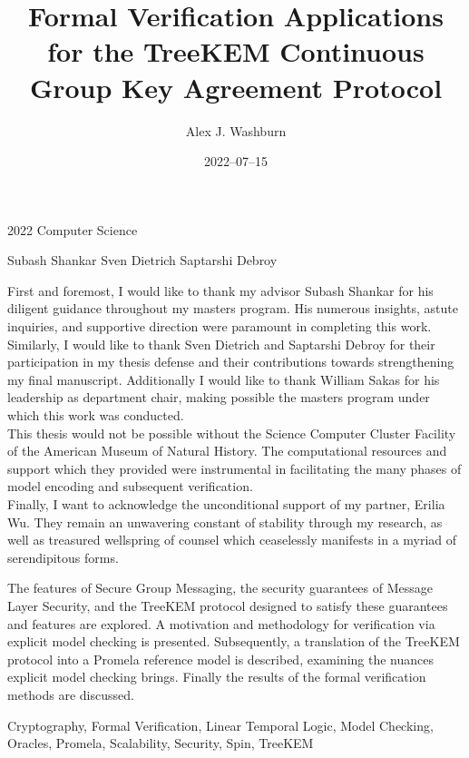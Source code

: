 %
\title%
           {Formal Verification Applications for the TreeKEM Continuous Group Key Agreement Protocol}
\date%
           {2022--07--15}
\annum%
           {2022}
\department%
           {Computer Science}

\author%
           {Alex J. Washburn}
\advisor%
           {Subash Shankar}
\reader%
           {Sven Dietrich}
\director%
           {Saptarshi Debroy}

\dedication%
{
This work is dedicated to future generations, with the hope that they experience secure communication which is intuitively usable, inveterately ubiquitous, and indelibly unrestricted.
}

\acknowledge%
{
First and foremost, I would like to thank my advisor Subash Shankar for his diligent guidance throughout my masters program.
His numerous insights, astute inquiries, and supportive direction were paramount in completing this work.
Similarly, I would like to thank Sven Dietrich and Saptarshi Debroy for their participation in my thesis defense and their contributions towards strengthening my final manuscript.
Additionally I would like to thank William Sakas for his leadership as department chair, making possible the masters program under which this work was conducted.\\
This thesis would not be possible without the Science Computer Cluster Facility of the American Museum of Natural History.
The computational resources and support which they provided were instrumental in facilitating the many phases of model encoding and subsequent verification.\\
Finally, I want to acknowledge the unconditional support of my partner, Erilia Wu. 
They remain an unwavering constant of stability through my research, as well as treasured wellspring of counsel which ceaselessly manifests in a myriad of serendipitous forms.
}

\abstract%
{
The features of Secure Group Messaging, the security guarantees of Message Layer Security, and the TreeKEM protocol designed to satisfy these guarantees and features are explored.
A motivation and methodology for verification via explicit model checking is presented.
Subsequently, a translation of the TreeKEM protocol into a Promela reference model is described, examining the nuances explicit model checking brings.
Finally the results of the formal verification methods are discussed.
}

\keywords%
{
Cryptography,
Formal Verification,
Linear Temporal Logic,
Model Checking,
Oracles,
Promela,
Scalability,
Security,
Spin,
TreeKEM
}
